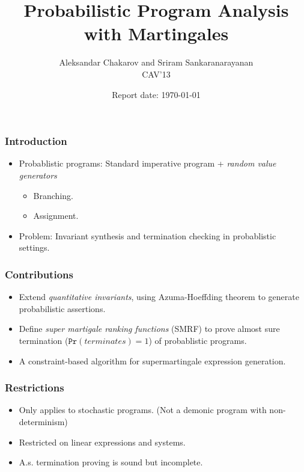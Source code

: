 \documentclass[11pt]{beamer}
\title{Probabilistic Program Analysis with Martingales}
\author{Aleksandar Chakarov and Sriram Sankaranarayanan\\
CAV'13
}
\date{Report date: \today}
\begin{document}
\maketitle
\begin{frame}\frametitle{Introduction}

\begin{itemize}
\item 
Probablistic programs: Standard imperative program + \emph{random value generators}


\begin{itemize}
\item Branching.

\item Assignment.

\end{itemize}

\item 
Problem: Invariant synthesis and termination checking in probablistic settings.



\end{itemize}
\end{frame}

\begin{frame}\frametitle{Contributions}
\begin{itemize}
\item Extend \emph{quantitative invariants}, using Azuma-Hoeffding theorem to generate probabilistic assertions.

\item Define \emph{super martigale ranking functions} (SMRF) to prove almost sure termination ($\texttt{Pr}(terminates) = 1$) of probablistic programs.
\item A constraint-based algorithm for supermartingale expression generation.
\end{itemize}
\end{frame}

\begin{frame}\frametitle{Restrictions}

\begin{itemize}

\item Only applies to stochastic programs. (Not a demonic program with non-determinism)

\item Restricted on linear expressions and systems.

\item A.s. termination proving is sound but incomplete.
\end{itemize}
\end{frame}
\end{document}
